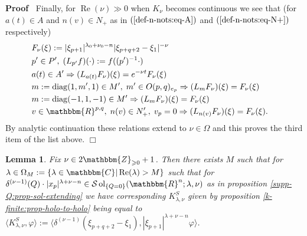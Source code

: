 \documentclass{article}
\newcommand{\assign}{:=}
\newcommand{\nocomma}{}
\newcommand{\tmop}[1]{\ensuremath{\operatorname{#1}}}
\newenvironment{proof}{\noindent\textbf{Proof\ }}{\hspace*{\fill}$\Box$\medskip}
\numberwithin{definition}{section}
\newtheorem{lemma}{Lemma}
\numberwithin{lemma}{section}
\numberwithin{proposition}{section}
{\theorembodyfont{\rmfamily}\newtheorem{remark}{Remark}
\numberwithin{remark}{section}
}
\begin{document}
\begin{proof}
  Finally, for $\tmop{Re} ( \nu) \gg 0$ when $K_{\nu}$ becomes continuous we
  see that (for $a ( t) \in A$ and $n ( v) \in N_+$ as in $(
  \ref{def-n-nots:eq-A})$ and $( \ref{def-n-nots:eq-N+})$ respectively)
  \begin{eqnarray}
    & F_{\nu} ( \xi) : = | \xi_{p + 1} |^{\lambda_0 + \nu_0 - n} | \xi_{p + q
    + 2} - \xi_1 |^{- \nu} &  \nonumber\\
    & p' \in P', \; ( L_{p'} f) ( \cdot) \assign f ( ( p')^{- 1} \cdot) & 
    \nonumber\\
    & a ( t) \in A' \Rightarrow ( L_{a ( t)} F_{\nu}) ( \xi) = e^{- \nu t}
    F_{\nu} ( \xi) &  \nonumber\\
    & m \assign \tmop{diag} ( 1, m', 1) \in M', \; m' \in O ( p, q)_{e_p}
    \Rightarrow ( L_m F_{\nu}) ( \xi) = F_{\nu} ( \xi) &  \nonumber\\
    & m \assign \tmop{diag} ( - 1, 1, - 1) \in M' \Rightarrow ( L_m F_{\nu})
    ( \xi) = F_{\nu} ( \xi) &  \nonumber\\
    & v \in \mathbbm{R}^{p, q}, \; n ( v) \in N_+', \; v_p = 0 \Rightarrow (
    L_{n ( v)} F_{\nu}) ( \xi) = F_{\nu} ( \xi) . &  \nonumber
  \end{eqnarray}
  By analytic continuation these relations extend to $\nu \in \Omega$ and this
  proves the third item of the list above.
\end{proof}

\begin{lemma}
  \label{k-finite:lem-c2}Fix $\nu \in 2\mathbbm{Z}_{\geqslant 0} + 1$. Then
  there exists $M$ such that for $\lambda \in \Omega_M \assign \{ \lambda \in
  \mathbbm{C} | \tmop{Re} ( \lambda) > M \}$ such that for $\delta^{( \nu -
  1)} ( Q) \cdot | x_p |^{\lambda + \nu - n} \in \mathcal{S} \tmop{ol}_{\{ Q =
  0 \}} ( \mathbbm{R}^n ; \lambda, \nu)$ as in proposition
  \ref{supp-Q:prop-sol-extending} we have corresponding $K^S_{\lambda, \nu}$
  given by proposition \ref{k-finite:prop-holo-to-holo} being equal to
  $\langle K_{\lambda, \nu}^S, \varphi \rangle \assign \langle \delta^{( \nu -
  1)} ( \xi_{p + q + 2} - \xi_1) \nocomma, | \xi_{p + 1} |^{\lambda + \nu - n}
  \varphi \nocomma \rangle$.
\end{lemma}
\end{document}
